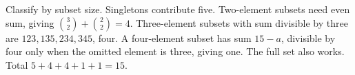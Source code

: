 Classify by subset size. Singletons contribute five. Two-element subsets need even sum, giving $\binom32+\binom22=4$. Three-element subsets with sum divisible by three are $123,135,234,345$, four. A four-element subset has sum $15-a$, divisible by four only when the omitted element is three, giving one. The full set also works. Total $5+4+4+1+1=\boxed{15}$.
